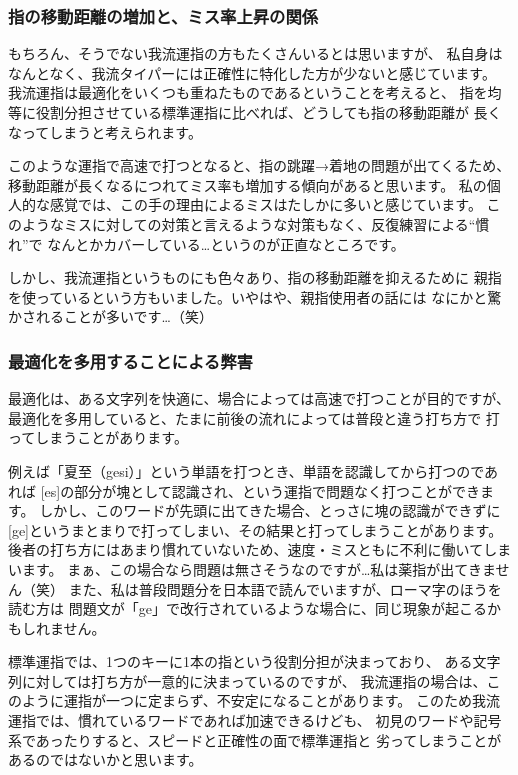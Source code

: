 \subsubsection*{指の移動距離の増加と、ミス率上昇の関係}

もちろん、そうでない我流運指の方もたくさんいるとは思いますが、
私自身はなんとなく、我流タイパーには正確性に特化した方が少ないと感じています。
我流運指は最適化をいくつも重ねたものであるということを考えると、
指を均等に役割分担させている標準運指に比べれば、どうしても指の移動距離が
長くなってしまうと考えられます。

このような運指で高速で打つとなると、指の跳躍→着地の問題が出てくるため、
移動距離が長くなるにつれてミス率も増加する傾向があると思います。
私の個人的な感覚では、この手の理由によるミスはたしかに多いと感じています。
このようなミスに対しての対策と言えるような対策もなく、反復練習による“慣れ”で
なんとかカバーしている…というのが正直なところです。


しかし、我流運指というものにも色々あり、指の移動距離を抑えるために
親指を使っているという方もいました。いやはや、親指使用者の話には
なにかと驚かされることが多いです…（笑）


\subsubsection*{最適化を多用することによる弊害}

最適化は、ある文字列を快適に、場合によっては高速で打つことが目的ですが、
最適化を多用していると、たまに前後の流れによっては普段と違う打ち方で
打ってしまうことがあります。

例えば「夏至（gesi）」という単語を打つとき、単語を認識してから打つのであれば
[es]の部分が塊として認識され、という運指で問題なく打つことができます。
しかし、このワードが先頭に出てきた場合、とっさに塊の認識ができずに
[ge]というまとまりで打ってしまい、その結果と打ってしまうことがあります。
後者の打ち方にはあまり慣れていないため、速度・ミスともに不利に働いてしまいます。
まぁ、この場合なら問題は無さそうなのですが…私は薬指が出てきません（笑）
また、私は普段問題分を日本語で読んでいますが、ローマ字のほうを読む方は
問題文が「ge」で改行されているような場合に、同じ現象が起こるかもしれません。


標準運指では、1つのキーに1本の指という役割分担が決まっており、
ある文字列に対しては打ち方が一意的に決まっているのですが、
我流運指の場合は、このように運指が一つに定まらず、不安定になることがあります。
このため我流運指では、慣れているワードであれば加速できるけども、
初見のワードや記号系であったりすると、スピードと正確性の面で標準運指と
劣ってしまうことがあるのではないかと思います。



